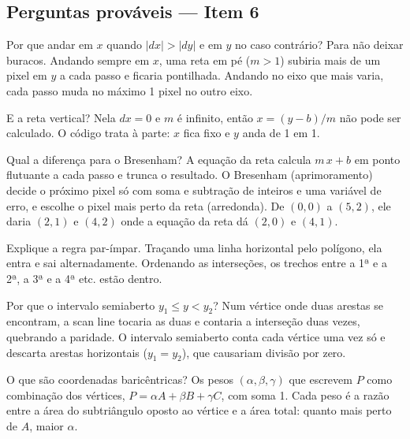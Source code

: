 \documentclass[11pt,a4paper]{article}
\begin{document}
\subsection{Perguntas prováveis — Item 6}

\begin{pergunta}{Por que andar em $x$ quando $|dx| > |dy|$ e em $y$ no caso contrário?}
Para não deixar buracos. Andando sempre em $x$, uma reta em pé ($m > 1$) subiria mais de um pixel em
$y$ a cada passo e ficaria pontilhada. Andando no eixo que mais varia, cada passo muda no máximo 1 pixel
no outro eixo.
\end{pergunta}

\begin{pergunta}{E a reta vertical?}
Nela $dx = 0$ e $m$ é infinito, então $x = (y - b)/m$ não pode ser calculado. O código trata à parte:
$x$ fica fixo e $y$ anda de 1 em 1.
\end{pergunta}

\begin{pergunta}{Qual a diferença para o Bresenham?}
A equação da reta calcula $m\,x + b$ em ponto flutuante a cada passo e trunca o resultado. O Bresenham
(aprimoramento) decide o próximo pixel só com soma e subtração de inteiros e uma variável de erro, e
escolhe o pixel mais perto da reta (arredonda). De $(0,0)$ a $(5,2)$, ele daria $(2,1)$ e $(4,2)$ onde a
equação da reta dá $(2,0)$ e $(4,1)$.
\end{pergunta}

\begin{pergunta}{Explique a regra par-ímpar.}
Traçando uma linha horizontal pelo polígono, ela entra e sai alternadamente. Ordenando as interseções,
os trechos entre a 1ª e a 2ª, a 3ª e a 4ª etc. estão dentro.
\end{pergunta}

\begin{pergunta}{Por que o intervalo semiaberto $y_1 \le y < y_2$?}
Num vértice onde duas arestas se encontram, a scan line tocaria as duas e contaria a interseção duas
vezes, quebrando a paridade. O intervalo semiaberto conta cada vértice uma vez só e descarta arestas
horizontais ($y_1 = y_2$), que causariam divisão por zero.
\end{pergunta}

\begin{pergunta}{O que são coordenadas baricêntricas?}
Os pesos $(\alpha,\beta,\gamma)$ que escrevem $P$ como combinação dos vértices, $P = \alpha A + \beta B +
\gamma C$, com soma 1. Cada peso é a razão entre a área do subtriângulo oposto ao vértice e a área
total: quanto mais perto de $A$, maior $\alpha$.
\end{pergunta}
\end{document}
